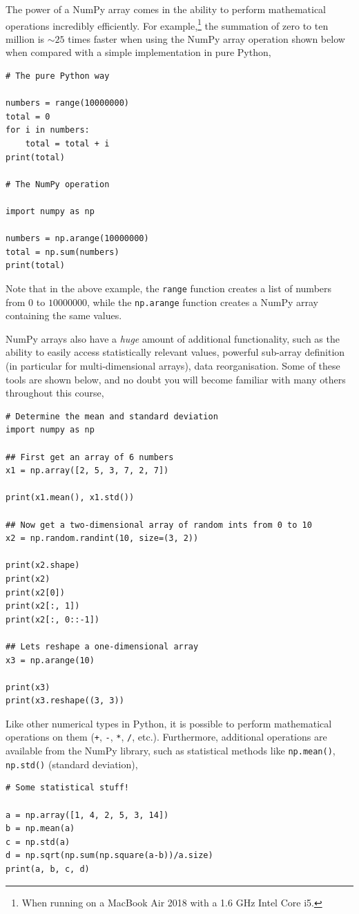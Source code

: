 \documentclass[a4paper]{article}
\begin{document}
The power of a NumPy array comes in the ability to perform mathematical operations incredibly efficiently.
For example,\footnote{When running on a MacBook Air 2018 with a 1.6 GHz Intel Core i5.} the summation of zero to ten million is $\sim 25$ times faster when using the NumPy array operation shown below when compared with a simple implementation in pure Python,
\begin{lstlisting}
# The pure Python way

numbers = range(10000000)
total = 0
for i in numbers:
    total = total + i
print(total)

# The NumPy operation

import numpy as np

numbers = np.arange(10000000)
total = np.sum(numbers)
print(total)
\end{lstlisting}
Note that in the above example, the \texttt{range} function creates a list of numbers from $0$ to $10000000$, while the \texttt{np.arange} function creates a NumPy array containing the same values.

NumPy arrays also have a \emph{huge} amount of additional functionality, such as the ability to easily access statistically relevant values, powerful sub-array definition (in particular for multi-dimensional arrays), data reorganisation.
Some of these tools are shown below, and no doubt you will become familiar with many others throughout this course,
\begin{lstlisting}
# Determine the mean and standard deviation
import numpy as np

## First get an array of 6 numbers
x1 = np.array([2, 5, 3, 7, 2, 7])

print(x1.mean(), x1.std())

## Now get a two-dimensional array of random ints from 0 to 10
x2 = np.random.randint(10, size=(3, 2))

print(x2.shape)
print(x2)
print(x2[0])
print(x2[:, 1])
print(x2[:, 0::-1])

## Lets reshape a one-dimensional array
x3 = np.arange(10)

print(x3)
print(x3.reshape((3, 3))
\end{lstlisting}

Like other numerical types in Python, it is possible to perform mathematical operations on them (\texttt{+}, \texttt{-}, \texttt{*}, \texttt{/}, etc.).
Furthermore, additional operations are available from the NumPy library, such as statistical methods like \texttt{np.mean()}, \texttt{np.std()} (standard deviation),
\begin{lstlisting}
# Some statistical stuff!

a = np.array([1, 4, 2, 5, 3, 14])
b = np.mean(a)
c = np.std(a)
d = np.sqrt(np.sum(np.square(a-b))/a.size)
print(a, b, c, d)
\end{lstlisting}
\end{document}

